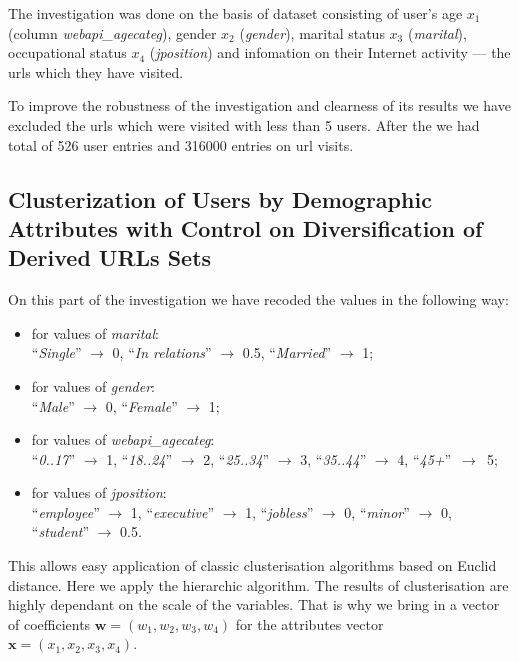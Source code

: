 \documentclass[runningheads,a4paper]{llncs}
\begin{document}
The investigation was done on the basis of dataset consisting of user's age $x_1$ (column \textit{webapi\_agecateg}), gender $x_2$ (\textit{gender}), marital status $x_3$ (\textit{marital}), occupational status $x_4$ (\textit{jposition}) and infomation on their Internet activity --- the urls which they have visited. 

To improve the robustness of the investigation and clearness of its results we have excluded the urls which were visited with less than 5 users. After the we had total of 526 user entries and 316000 entries on url visits.




\subsection{Clusterization of Users by Demographic Attributes with Control on Diversification of Derived URLs Sets}



On this part of the investigation we have recoded the values in the following way:
\begin{itemize}
\item for values of \textit{marital}: \\ 
	``\textit{Single}''  $\to$ 0,  \quad  ``\textit{In relations}''  $\to$ 0.5, \quad  ``\textit{Married}''  $\to$ 1;
\item for values of \textit{gender}: \\ 
	``\textit{Male}''  $\to$ 0, \quad  ``\textit{Female}'' $\to$ 1;
\item for values of \textit{webapi\_agecateg}: \\ 
	``\textit{0..17}''  $\to$ 1, \quad  ``\textit{18..24}''  $\to$ 2, \quad     ``\textit{25..34}''  $\to$ 3, \quad  ``\textit{35..44}''  $\to$ 4, \quad     \mbox{``\textit{45+}''  $\to$ 5};
\item for values of \textit{jposition}: \\ 
	``\textit{employee}'' $\to$ 1, \quad  ``\textit{executive}'' $\to$ 1, \quad  ``\textit{jobless}'' $\to$ 0, \quad  ``\textit{minor}'' $\to$ 0, \quad  ``\textit{student}'' $\to$ 0.5.
\end{itemize}

This allows easy application of classic clusterisation algorithms based on  	Euclid distance. Here we apply the hierarchic algorithm. The results of clusterisation are highly dependant on the scale of the variables. That is why we bring in a vector of coefficients $\boldsymbol{w} = (w_1, w_2, w_3, w_4)$ for the attributes vector $\boldsymbol{x} = (x_1, x_2, x_3, x_4)$.
\end{document}
